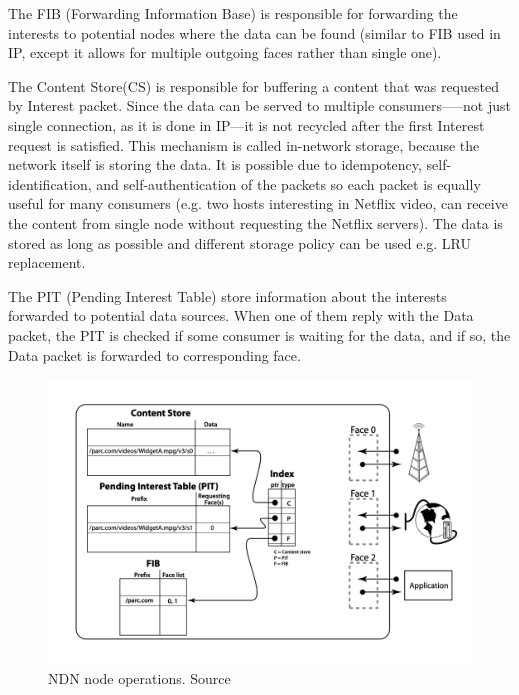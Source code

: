 The FIB (Forwarding
Information Base) is responsible for forwarding the interests to potential nodes where the data can be found (similar to FIB used in IP, except it allows for multiple outgoing faces rather than single one). 

The Content Store(CS) is responsible for buffering a content that was requested by Interest packet. Since the data can be served to multiple consumers–––not just single connection, as it is done in IP––it is not recycled after the first Interest request is satisfied. This mechanism is called in-network storage, because the network itself is storing the data. It is possible due to idempotency, self-identification, and self-authentication of the packets so each packet is equally useful for many consumers (e.g. two hosts interesting in Netflix video, can receive the content from single node without requesting the Netflix servers). The data is stored as long as possible and different storage policy can be used e.g. LRU replacement.

The PIT (Pending Interest Table) store information about the interests forwarded to potential data sources. When one of them reply with the Data packet, the PIT is checked if some consumer is waiting for the data, and if so, the Data packet is forwarded to corresponding face.
\begin{figure}[h]
    \centering
    \includegraphics[width=\linewidth]{img/ndn-operations.png}
    \caption{NDN node operations. Source \cite{jacobson2009networking}}
    \label{fig:ndn-operations}
\end{figure}

